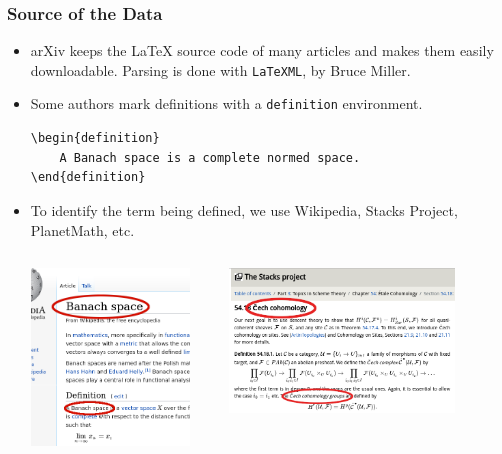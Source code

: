 \documentclass[10pt]{beamer}
\begin{document}
\begin{frame}[fragile]
    \frametitle{Source of the Data}
    \begin{itemize}
        \item arXiv keeps the \LaTeX{} source code of many articles and makes them easily downloadable. Parsing is done with \texttt{LaTeXML}, by Bruce Miller.
            \pause
        \item Some authors mark definitions with a \texttt{definition} environment.
            \begin{verbatim}
\begin{definition}
    A Banach space is a complete normed space.  
\end{definition}
    \end{verbatim}
    \pause
\item To identify the term being defined, we use Wikipedia, Stacks Project, PlanetMath, etc.
    \begin{columns}
        \begin{column}{0.4\textwidth}
            \includegraphics[width=0.9\textwidth]{../Images/wiki_thin_banach.png}
        \end{column}
        \pause
        \begin{column}{0.6\textwidth}
            \includegraphics[width=0.8\textwidth]{../Images/stacks_defs.png}

\end{column}
\end{columns}
\end{itemize}
\end{frame}
\end{document}
